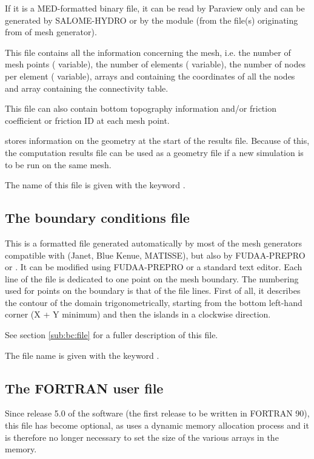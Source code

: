 If it is a MED-formatted binary file, it can be read by
Paraview only and can be generated by SALOME-HYDRO
or by the \stbtel module (from the file(s) originating from of mesh generator).

This file contains all the information concerning the mesh,
i.e. the number of mesh points ( variable),
the number of elements ( variable),
the number of nodes per element ( variable),
arrays  and  containing the coordinates of all the nodes
and array  containing the connectivity table.

This file can also contain bottom topography information and/or
friction coefficient or friction ID at each mesh point.

 stores information on the geometry at the start of the results file.
Because of this, the computation results file can be used as a geometry file
if a new simulation is to be run on the same mesh.

The name of this file is given with the keyword .


\subsection{The boundary conditions file}

This is a formatted file generated automatically by most of the mesh generators
compatible with \tel (Janet, Blue Kenue, MATISSE),
but also by FUDAA-PREPRO or \stbtel.
It can be modified using FUDAA-PREPRO or a standard text editor.
Each line of the file is dedicated to one point on the mesh boundary.
The numbering used for points on the boundary is that of the file lines.
First of all, it describes the contour of the domain trigonometrically,
starting from the bottom left-hand corner (X + Y minimum) and then the islands
in a clockwise direction.

See section \ref{sub:bc:file} for a fuller description of this file.

The file name is given with the keyword .


\subsection{The FORTRAN user file}
\label{subs:FORT:user:file}
Since release 5.0 of the software (the first release to be written in
FORTRAN 90), this file has become optional, as  uses
a dynamic memory allocation process and it is therefore no longer necessary
to set the size of the various arrays in the memory.


